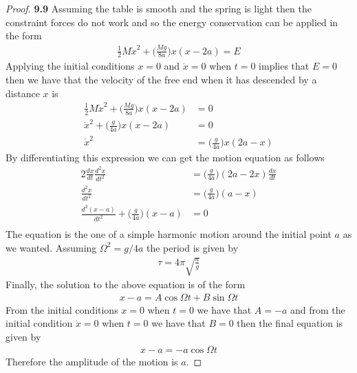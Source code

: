 \documentclass[11pt]{article}
\theoremstyle{definition}
\begin{document}
\begin{proof}{\textbf{9.9}}
        Assuming the table is smooth and the spring is light then the
        constraint forces do not work and so the energy conservation can be
        applied in the form
        \begin{align*}
            \frac{1}{2}M\dot{x}^2 +
            \bigg(\frac{Mg}{8a}\bigg)x(x -2a) = E
        \end{align*}
        Applying the initial conditions $x=0$ and $\dot{x} = 0$ when 
        $t=0$ implies that $E = 0$ then we have that the velocity of the
        free end when it has descended by a distance $x$ is
        \begin{align*}
            \frac{1}{2}M\dot{x}^2 +
            \bigg(\frac{Mg}{8a}\bigg)x(x -2a)
            &= 0\\
            \dot{x}^2 +
            \bigg(\frac{g}{4a}\bigg)x(x -2a)
            &= 0\\
            \dot{x}^2 &=
            \bigg(\frac{g}{4a}\bigg)x(2a - x)
        \end{align*}
        By differentiating this expression we can get the motion equation as
        follows
        \begin{align*}
            2\frac{dx}{dt}\frac{d^2x}{dt^2} &=
            \bigg(\frac{g}{4a}\bigg)(2a - 2x)\frac{dx}{dt}\\
            \frac{d^2x}{dt^2} &= \bigg(\frac{g}{4a}\bigg)(a - x)\\
            \frac{d^2(x-a)}{dt^2} + \bigg(\frac{g}{4a}\bigg)(x-a) &= 0\\
        \end{align*}
        The equation is the one of a simple harmonic motion around the initial
        point $a$ as we wanted. 
        Assuming $\Omega^2 = g/4a$ the period is given by
        \begin{align*}
            \tau = 4\pi\sqrt{\frac{a}{g}}
        \end{align*}
        Finally, the solution to the above equation is of the form
        \begin{align*}
            x - a = A\cos\Omega t + B \sin \Omega t
        \end{align*}
        From the initial conditions $x = 0$ when $t=0$ we have that $A = -a$
        and from the initial condition $\dot{x} = 0$ when $t=0$ we have that
        $B = 0$ then the final equation is given by
        \begin{align*}
            x - a = -a\cos\Omega t
        \end{align*}
        Therefore the amplitude of the motion is $a$.
    \end{proof}
\end{document}
